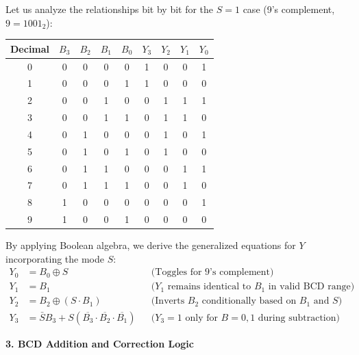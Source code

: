 \documentclass[12pt,a3paper]{article}
\begin{document}
\begin{enumerate}
\begin{tcolorbox}[enhanced,breakable,ansbox,colback=cD!4,colframe=cD,boxrule=0.8pt,arc=5pt,title={\textbf{Answer}},fonttitle=\bfseries\color{white},colbacktitle=cD]
Let us analyze the relationships bit by bit for the $S=1$ case (9's complement, $9 = 1001_2$):
\begin{center}
\renewcommand{\arraystretch}{1.2}
\begin{tabular}{@{}c|cccc|cccc@{}}
\toprule
\textbf{Decimal} & $B_3$ & $B_2$ & $B_1$ & $B_0$ & $Y_3$ & $Y_2$ & $Y_1$ & $Y_0$ \\ \midrule
0 & 0 & 0 & 0 & 0 & 1 & 0 & 0 & 1 \\
1 & 0 & 0 & 0 & 1 & 1 & 0 & 0 & 0 \\
2 & 0 & 0 & 1 & 0 & 0 & 1 & 1 & 1 \\
3 & 0 & 0 & 1 & 1 & 0 & 1 & 1 & 0 \\
4 & 0 & 1 & 0 & 0 & 0 & 1 & 0 & 1 \\
5 & 0 & 1 & 0 & 1 & 0 & 1 & 0 & 0 \\
6 & 0 & 1 & 1 & 0 & 0 & 0 & 1 & 1 \\
7 & 0 & 1 & 1 & 1 & 0 & 0 & 1 & 0 \\
8 & 1 & 0 & 0 & 0 & 0 & 0 & 0 & 1 \\
9 & 1 & 0 & 0 & 1 & 0 & 0 & 0 & 0 \\ \bottomrule
\end{tabular}
\end{center}

By applying Boolean algebra, we derive the generalized equations for $Y$ incorporating the mode $S$:
\begin{align*}
    Y_0 &= B_0 \oplus S && \text{(Toggles for 9's complement)} \\
    Y_1 &= B_1 && \text{($Y_1$ remains identical to $B_1$ in valid BCD range)} \\
    Y_2 &= B_2 \oplus (S \cdot B_1) && \text{(Inverts $B_2$ conditionally based on $B_1$ and $S$)} \\
    Y_3 &= \bar{S}B_3 + S(\overline{B_3} \cdot \overline{B_2} \cdot \overline{B_1}) && \text{($Y_3=1$ only for $B=0,1$ during subtraction)}
\end{align*}

\vspace{1em}
\textbf{\textcolor{cD}{3. BCD Addition and Correction Logic}}


\end{tcolorbox}
\end{enumerate}
\end{document}
